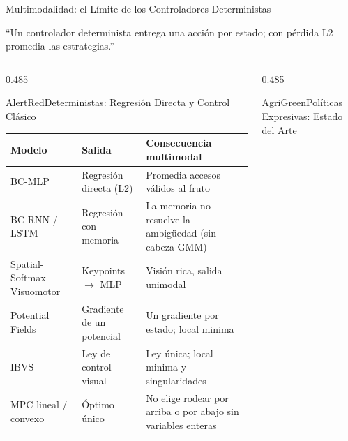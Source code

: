\documentclass[aspectratio=169,10pt,xcolor={dvipsnames,table}]{beamer}
\newcommand{\BannerFont}{\fontsize{7.5}{9.2}\selectfont\bfseries}       %
\newcommand{\BannerArc}{1.5pt}             %
\newcommand{\BannerRule}{0.5pt}            %
\newcommand{\BannerLeftRule}{2.5pt}        %
\newcommand{\CardHeightTall}{46mm}         %
\newcommand{\BannerCentral}[2][UCNCyan]{%
  \begin{tcolorbox}[
    enhanced,
    colback=#1!10,
    colframe=#1,
    boxrule=\BannerRule,
    leftrule=\BannerLeftRule,
    arc=\BannerArc,
    top=0.35mm, bottom=0.35mm, left=2mm, right=2mm
  ]
    {\BannerFont\raggedright\textcolor{UCNBlue}{#2}\par}
  \end{tcolorbox}%
  \vspace{-2.5mm}%
}
\begin{document}
\begin{frame}{Multimodalidad: el Límite de los Controladores Deterministas}
  \BannerCentral[AlertRed]{``Un controlador determinista entrega una acción por estado; con pérdida L2 promedia las estrategias.''}
  \vspace{0.8mm}
  \begin{columns}[T, onlytextwidth]
    \begin{column}{0.485\textwidth}
      \begin{Card}[height=\CardHeightTall]{AlertRed}{Deterministas: Regresión Directa y Control Clásico}
        {\fontsize{4.9}{5.8}\selectfont
        \setlength{\tabcolsep}{1.8pt}
        \renewcommand{\arraystretch}{1.0}
        \begin{tabular}{@{}>{\raggedright\arraybackslash}p{25mm} >{\raggedright\arraybackslash}p{19mm} >{\raggedright\arraybackslash}p{22mm}@{}}
          \toprule
          \textbf{Modelo} & \textbf{Salida} & \textbf{Consecuencia multimodal} \\
          \midrule
          BC-MLP \cite{pomerleau1989alvinn} & Regresión directa (L2) & Promedia accesos válidos al fruto \\
          BC-RNN / LSTM \cite{mandlekar2021robomimic} & Regresión con memoria & La memoria no resuelve la ambigüedad (sin cabeza GMM) \\
          Spatial-Softmax Visuomotor \cite{levine2016end} & Keypoints $\to$ MLP & Visión rica, salida unimodal \\
          Potential Fields \cite{khatib1986real} & Gradiente de un potencial & Un gradiente por estado; local minima \\
          IBVS \cite{chaumette2006visual} & Ley de control visual & Ley única; local minima y singularidades \\
          MPC lineal / convexo \cite{mayne2000constrained} & Óptimo único & No elige rodear por arriba o por abajo sin variables enteras \\
          \bottomrule
        \end{tabular}}
      \end{Card}
    \end{column}
    \begin{column}{0.485\textwidth}
      \begin{Card}[height=\CardHeightTall]{AgriGreen}{Políticas Expresivas: Estado del Arte}

\end{Card}
\end{column}
\end{columns}
\end{frame}
\end{document}
